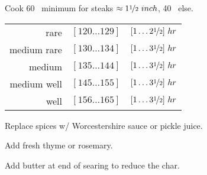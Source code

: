 \begin{variation}
\item Cook 60 \minute~minimum for steaks $\approx1\nicefrac{1}{2}~inch$, 40 \minute~else.
	\begin{center}
	\begin{tabular}{r l l}
	rare        & $[120 \ldots 129]$ \Fahrenheit & $[1 \ldots 2\nicefrac{1}{2}]~hr$\\
	medium rare & $[130 \ldots 134]$ \Fahrenheit & $[1 \ldots 3\nicefrac{1}{2}]~hr$\\
	medium      & $[135 \ldots 144]$ \Fahrenheit & $[1 \ldots 3\nicefrac{1}{2}]~hr$\\
	medium well & $[145 \ldots 155]$ \Fahrenheit & $[1 \ldots 3\nicefrac{1}{2}]~hr$\\
	well        & $[156 \ldots 165]$ \Fahrenheit & $[1 \ldots 3\nicefrac{1}{2}]~hr$
	\end{tabular}
	\end{center}

\item Replace spices w/ Worcestershire sauce or pickle juice.

\item Add fresh thyme or rosemary.

\item Add butter at end of searing to reduce the char.
\end{variation}


\recipeend
